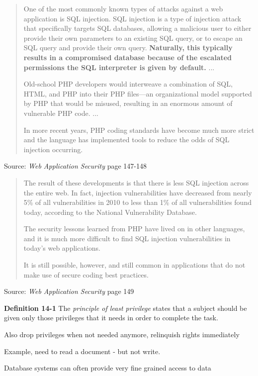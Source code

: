 \documentclass[Screen16to9,17pt]{foils}
\begin{document}

\begin{quote}
One of the most commonly known types of attacks against a web application is SQL injection. SQL injection is a type of injection attack that specifically targets SQL databases, allowing a malicious user to either provide their own parameters to an existing SQL query, or to escape an SQL query and provide their own query. {\bf Naturally, this typically results in a compromised database because of the escalated permissions the SQL interpreter is given by default.}
...

Old-school PHP developers would interweave a combination of
SQL, HTML, and PHP into their PHP files—an organizational model supported by
PHP that would be misused, resulting in an enormous amount of vulnerable PHP
code.
...

In more recent years, PHP coding standards have become much more strict and the
language has implemented tools to reduce the odds of SQL injection occurring.
\end{quote}
Source: \emph{Web Application Security} page 147-148






\begin{quote}
The result of these developments is that there is less SQL injection across the entire web. In fact, injection vulnerabilities have decreased from nearly 5\% of all vulnerabilities in 2010 to less than 1\% of all vulnerabilities found today, according to the National Vulnerability Database.

The security lessons learned from PHP have lived on in other languages, and it is much more difficult to find SQL injection vulnerabilities in today’s web applications.

It is still possible, however, and still common in applications that do not make use of secure coding best practices.
\end{quote}
Source: \emph{Web Application Security} page 149






\begin{list1}
\item {\bf Definition 14-1} The \emph{principle of least privilege} states that a subject should be given only those privileges that it needs in order to complete the task.
\item Also drop privileges when not needed anymore, relinquish rights immediately
\item Example, need to read a document - but not write.
\item Database systems can often provide very fine grained access to data
\end{list1}
\end{document}
